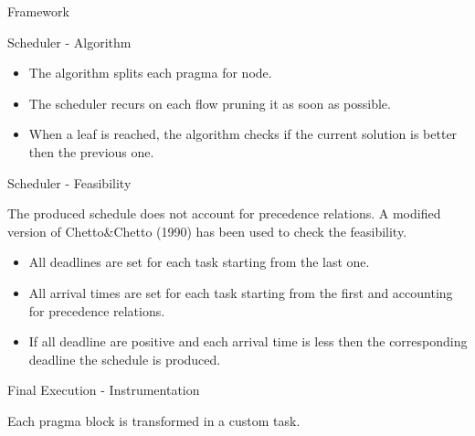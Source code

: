 \documentclass[xcolor=dvipsnames]{beamer}
\begin{document}
\begin{section}{Framework}
\begin{frame}{\hskip 0.3cm Scheduler - Algorithm}
\begin{itemize}
\item The algorithm splits each pragma for node.

\item The scheduler recurs on each flow pruning it as soon as possible.

\item When a leaf is reached, the algorithm checks if the current solution is better then the previous one.

\end{itemize}

\end{frame}












\begin{frame}{\hskip 0.3cm Scheduler - Feasibility}

The produced schedule does not account for precedence relations. A modified version of Chetto\&Chetto (1990) has been used to check the feasibility.

\begin{itemize}

\item All deadlines are set for each task starting from the last one.

\item All arrival times are set for each task starting from the first and accounting for precedence relations.

\item If all deadline are positive and each arrival time is less then the corresponding deadline the schedule is produced.

\end{itemize}



\end{frame}













\begin{frame}{\hskip 0.3cm Final Execution - Instrumentation}

Each pragma block is transformed in a custom task.


\begin{itemize}


\end{itemize}
\end{frame}
\end{section}
\end{document}
